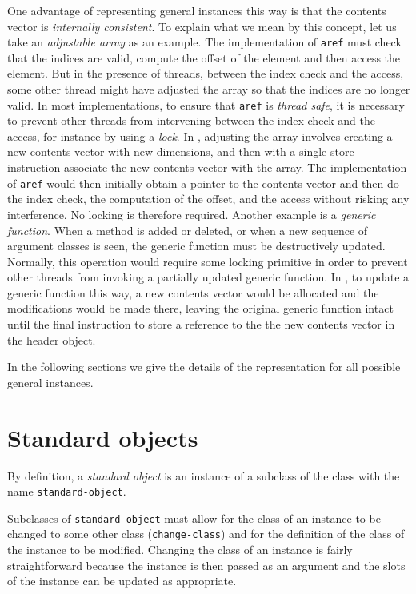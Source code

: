 One advantage of representing general instances this way is that the
contents vector is \emph{internally consistent}.  To explain what we
mean by this concept, let us take an \emph{adjustable array} as an
example.  The implementation of \texttt{aref} must check that the
indices are valid, compute the offset of the element and then access
the element.  But in the presence of threads, between the index check
and the access, some other thread might have adjusted the array so
that the indices are no longer valid.  In most implementations, to
ensure that \texttt{aref} is \emph{thread safe}, it is necessary to
prevent other threads from intervening between the index check and the
access, for instance by using a \emph{lock}.  In \sysname{}, adjusting
the array involves creating a new contents vector with new dimensions,
and then with a single store instruction associate the new contents
vector with the array.  The implementation of \texttt{aref} would then
initially obtain a pointer to the contents vector and then do the
index check, the computation of the offset, and the access without
risking any interference.  No locking is therefore required.  Another
example is a \emph{generic function}.  When a method is added or
deleted, or when a new sequence of argument classes is seen, the
generic function must be destructively updated.  Normally, this
operation would require some locking primitive in order to prevent
other threads from invoking a partially updated generic function.  In
\sysname{}, to update a generic function this way, a new contents
vector would be allocated and the modifications would be made there,
leaving the original generic function intact until the final
instruction to store a reference to the the new contents vector in the
header object. 

In the following sections we give the details of the representation
for all possible general instances.

\section{Standard objects}
\label{sec-data-representation-standard-objects}

By definition, a \emph{standard object} is an instance of a subclass
of the class with the name \texttt{standard-object}.

Subclasses of \texttt{standard-object} must allow for the class of an
instance to be changed to some other class (\texttt{change-class}) and
for the definition of the class of the instance to be modified.
Changing the class of an instance is fairly straightforward because
the instance is then passed as an argument and the slots of the
instance can be updated as appropriate.

